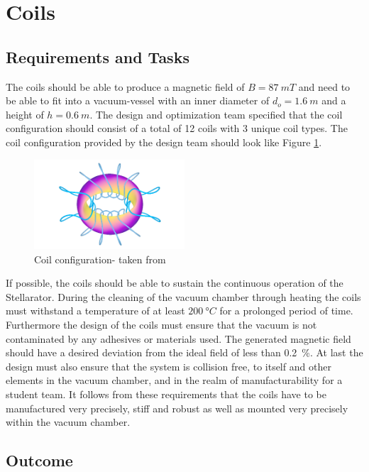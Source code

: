 \section{Coils}
\subsection{Requirements and Tasks}
The coils should be able to produce a magnetic field of $B = \SI{87}{mT}$ and need to be able to fit into a vacuum-vessel with an inner diameter of $d_o=\SI{1.6}{m}$ and a height of $h=\SI{0.6}{m}$.
The design and optimization team specified that the coil configuration should consist of a total of 12 coils with 3 unique coil types.
The coil configuration provided by the design team should look like Figure \ref{fig:config}.
\begin{figure}[h]
    \centering
    \includegraphics[width=0.5\textwidth]{Images/02_Coils/coil_config.png}
    \caption{Coil configuration- taken from \cite{QUASR}}
    \label{fig:config}
\end{figure}
If possible, the coils should be able to sustain the continuous operation of the Stellarator.
During the cleaning of the vacuum chamber through heating the coils must withstand a temperature of at least $\SI{200}{\degree C}$ for a prolonged period of time.
Furthermore the design of the coils must ensure that the vacuum is not contaminated by any adhesives or materials used.
The generated magnetic field should have a desired deviation from the ideal field of less than \SI{0.2}{\%}.
At last the design must also ensure that the system is collision free, to itself and other elements in the vacuum chamber, and in the realm of manufacturability for a student team.
It follows from these requirements that the coils have to be manufactured very precisely, stiff and robust as well as mounted very precisely within the vacuum chamber.



\subsection{Outcome}

